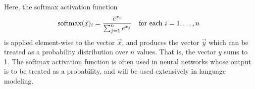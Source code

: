 Here, the softmax activation function
\begin{equation}
    \operatorname{softmax}(\vec x)_i = \frac{e^{x_i}}{\sum_{j=1}^n e^{x_j}} \quad \text{for each $i=1, \dots, n$} \label{eq:neural-networks:softmax}
\end{equation}
is applied element-wise to the vector $\vec x$, and produces the vector $\vec y$ which can be treated as a probability distribution over $n$ values.
That is, the vector $y$ sums to 1.
The softmax activation function is often used in neural networks whose output is to be treated as a probability, and will be used extensively in language modeling.

